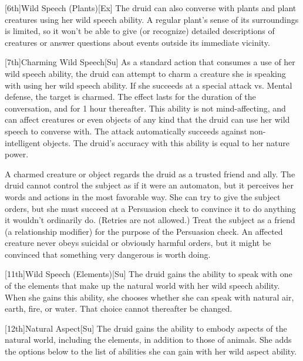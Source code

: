 [6th]{Wild Speech (Plants)}[Ex]
The druid can also converse with plants and plant creatures using her wild speech ability.
A regular plant's sense of its surroundings is limited, so it won't be able to give (or recognize) detailed descriptions of creatures or answer questions about events outside its immediate vicinity.

[7th]{Charming Wild Speech}[Su]
As a standard action that consumes a use of her wild speech ability, the druid can attempt to charm a creature she is speaking with using her wild speech ability.
If she succeeds at a special attack vs. Mental defense, the target is charmed.
The effect lasts for the duration of the conversation, and for 1 hour thereafter.
This ability is not mind-affecting, and can affect creatures or even objects of any kind that the druid can use her wild speech to converse with.
The attack automatically succeeds against non-intelligent objects.
The druid's accuracy with this ability is equal to her nature power.

A charmed creature or object regards the druid as a trusted friend and ally.
The druid cannot control the subject as if it were an automaton, but it perceives her words and actions in the most favorable way.
She can try to give the subject orders, but she must succeed at a Persuasion check to convince it to do anything it wouldn't ordinarily do.
(Retries are not allowed.) Treat the subject as a friend (a  relationship modifier) for the purpose of the Persuasion check.
An affected creature never obeys suicidal or obviously harmful orders, but it might be convinced that something very dangerous is worth doing.

[11th]{Wild Speech (Elements)}[Su]
The druid gains the ability to speak with one of the elements that make up the natural world with her wild speech ability.
When she gains this ability, she chooses whether she can speak with natural air, earth, fire, or water.
That choice cannot thereafter be changed.

[12th]{Natural Aspect}[Su]
The druid gains the ability to embody aspects of the natural world, including the elements, in addition to those of animals.
She adds the options below to the list of abilities she can gain with her wild aspect ability.

